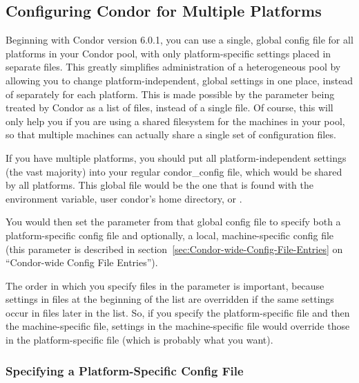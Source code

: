 \subsection{Configuring Condor for Multiple Platforms}
\label{sec:Multiple-Platforms}

Beginning with Condor version 6.0.1, you can use a single, global
config file for all platforms in your Condor pool, with only
platform-specific settings placed in separate files.  This greatly
simplifies administration of a heterogeneous pool by allowing you to
change platform-independent, global settings in one place, instead of
separately for each platform.  This is made possible by the
 parameter being treated by Condor as a
list of files, instead of a single file.  Of course, this will only
help you if you are using a shared filesystem for the machines in your
pool, so that multiple machines can actually share a single set of
configuration files.

If you have multiple platforms, you should put all
platform-independent settings (the vast majority) into your regular
condor\_config file, which would be shared by all platforms.  This
global file would be the one that is found with the
 environment variable, user condor's home
directory, or .

You would then set the  parameter from that
global config file to specify both a platform-specific config file and
optionally, a local, machine-specific config file (this parameter is
described in section~\ref{sec:Condor-wide-Config-File-Entries} on
``Condor-wide Config File Entries'').

The order in which you specify files in the
 parameter is important, because settings
in files at the beginning of the list are overridden if the same
settings occur in files later in the list.  So, if you specify the
platform-specific file and then the machine-specific file, settings in
the machine-specific file would override those in the
platform-specific file (which is probably what you want).  

\subsubsection{Specifying a Platform-Specific Config File}
\label{sec:Specify-Platform-Files}

